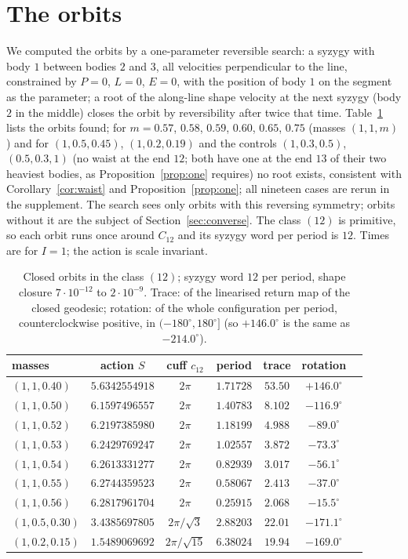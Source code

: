 \documentclass[11pt]{article}
\theoremstyle{definition}
\begin{document}
\section{The orbits}\label{sec:orbits}

We computed the orbits by a one-parameter reversible search: a syzygy with body $1$ between bodies $2$ and $3$, all
velocities perpendicular to the line, constrained by $P=0$, $L=0$, $E=0$, with the position of body $1$ on the segment
as the parameter; a root of the along-line shape velocity at the next syzygy (body $2$ in the middle) closes the orbit
by reversibility after twice that time. Table~\ref{tab:orbits} lists the orbits found; for $m=0.57$, $0.58$, $0.59$,
$0.60$, $0.65$, $0.75$ (masses $(1,1,m)$) and for $(1,0.5,0.45)$, $(1,0.2,0.19)$ and the controls $(1,0.3,0.5)$,
$(0.5,0.3,1)$ (no waist at the end $12$; both have one at the end $13$ of their two heaviest bodies, as
Proposition~\ref{prop:one} requires) no root exists, consistent with Corollary~\ref{cor:waist} and
Proposition~\ref{prop:one}; all nineteen cases are rerun in the supplement. The search sees only orbits with this
reversing symmetry; orbits without it are the
subject of Section~\ref{sec:converse}. The class $(12)$ is primitive, so each orbit runs once around $C_{12}$ and its
syzygy word per period is $12$. Times are for $I=1$; the action is scale invariant.

\begin{table}[h]
\centering
\begin{tabular}{lcccccc}
\toprule
masses & action $S$ & cuff $c_{12}$ & period & trace & rotation \\
\midrule
$(1,1,0.40)$ & $5.6342554918$ & $2\pi$ & $1.71728$ & $53.50$ & $+146.0^\circ$ \\
$(1,1,0.50)$ & $6.1597496557$ & $2\pi$ & $1.40783$ & $8.102$ & $-116.9^\circ$ \\
$(1,1,0.52)$ & $6.2197385980$ & $2\pi$ & $1.18199$ & $4.988$ & $-89.0^\circ$ \\
$(1,1,0.53)$ & $6.2429769247$ & $2\pi$ & $1.02557$ & $3.872$ & $-73.3^\circ$ \\
$(1,1,0.54)$ & $6.2613331277$ & $2\pi$ & $0.82939$ & $3.017$ & $-56.1^\circ$ \\
$(1,1,0.55)$ & $6.2744359523$ & $2\pi$ & $0.58067$ & $2.413$ & $-37.0^\circ$ \\
$(1,1,0.56)$ & $6.2817961704$ & $2\pi$ & $0.25915$ & $2.068$ & $-15.5^\circ$ \\
$(1,0.5,0.30)$ & $3.4385697805$ & $2\pi/\sqrt3$ & $2.88203$ & $22.01$ & $-171.1^\circ$ \\
$(1,0.2,0.15)$ & $1.5489069692$ & $2\pi/\sqrt{15}$ & $6.38024$ & $19.94$ & $-169.0^\circ$ \\
\bottomrule
\end{tabular}
\caption{Closed orbits in the class $(12)$; syzygy word $12$ per period, shape closure $7\cdot10^{-12}$ to
$2\cdot10^{-9}$. Trace: of the linearised return map of the closed geodesic; rotation: of the whole configuration per
period, counterclockwise positive, in $(-180^\circ,180^\circ]$ (so $+146.0^\circ$ is the same as $-214.0^\circ$).}
\label{tab:orbits}
\end{table}
\end{document}
